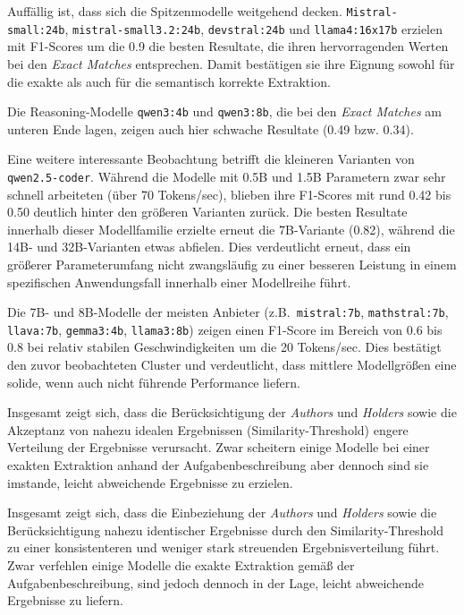 Auffällig ist, dass sich die Spitzenmodelle weitgehend decken. \texttt{Mistral-small:24b}, \texttt{mistral-small3.2:24b}, \texttt{devstral:24b} und \texttt{llama4:16x17b} erzielen mit F1-Scores um die \num{0.9} die besten Resultate, die ihren hervorragenden Werten bei den \textit{Exact Matches} entsprechen.
Damit bestätigen sie ihre Eignung sowohl für die exakte als auch für die semantisch korrekte Extraktion.

Die Reasoning-Modelle \texttt{qwen3:4b} und \texttt{qwen3:8b}, die bei den \textit{Exact Matches} am unteren Ende lagen, zeigen auch hier schwache Resultate (\num{0.49} bzw. \num{0.34}).

Eine weitere interessante Beobachtung betrifft die kleineren Varianten von \texttt{qwen2.5-coder}.
Während die Modelle mit 0.5B und 1.5B Parametern zwar sehr schnell arbeiteten (über 70 Tokens/sec), blieben ihre F1-Scores mit rund \num{0.42} bis \num{0.50} deutlich hinter den größeren Varianten zurück.
Die besten Resultate innerhalb dieser Modellfamilie erzielte erneut die 7B-Variante (\num{0.82}), während die 14B- und 32B-Varianten etwas abfielen.
Dies verdeutlicht erneut, dass ein größerer Parameterumfang nicht zwangsläufig zu einer besseren Leistung in einem spezifischen Anwendungsfall innerhalb einer Modellreihe führt.

Die 7B- und 8B-Modelle der meisten Anbieter (z.B.\ \texttt{mistral:7b}, \texttt{mathstral:7b}, \texttt{llava:7b}, \texttt{gemma3:4b}, \texttt{llama3:8b}) zeigen einen F1-Score im Bereich von \num{0.6} bis \num{0.8} bei relativ stabilen Geschwindigkeiten um die 20 Tokens/sec.
Dies bestätigt den zuvor beobachteten Cluster und verdeutlicht, dass mittlere Modellgrößen eine solide, wenn auch nicht führende Performance liefern.

Insgesamt zeigt sich, dass die Berücksichtigung der \textit{Authors} und \textit{Holders} sowie die Akzeptanz von nahezu idealen Ergebnissen (Similarity-Threshold) engere Verteilung der Ergebnisse verursacht.
Zwar scheitern einige Modelle bei einer exakten Extraktion anhand der Aufgabenbeschreibung aber dennoch sind sie imstande, leicht abweichende Ergebnisse zu erzielen.

Insgesamt zeigt sich, dass die Einbeziehung der \textit{Authors} und \textit{Holders} sowie die Berücksichtigung nahezu identischer Ergebnisse durch den Similarity-Threshold zu einer konsistenteren und weniger stark streuenden Ergebnisverteilung führt.
Zwar verfehlen einige Modelle die exakte Extraktion gemäß der Aufgabenbeschreibung, sind jedoch dennoch in der Lage, leicht abweichende Ergebnisse zu liefern.


